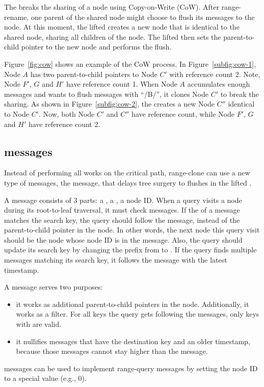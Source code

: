 The \bedag breaks the sharing of a node using Copy-on-Write (CoW).
After range-rename, one parent of the shared node might choose to flush its
messages to the node.
At this moment, the lifted \bedag creates a new node that is identical to the
shared node, sharing all children of the node.
The lifted \bedag then sets the parent-to-child pointer to the new node and
performs the flush.

Figure~\ref{fig:cow} shows an example of the CoW process.
In Figure~\ref{subfig:cow-1}, Node $A$ has two parent-to-child pointers to
Node $C'$ with reference count 2.
Note, Node $F'$, $G$ and $H'$ have reference count 1.
When Node $A$ accumulates enough messages and wants to flush messages with
``/B/'', it clones Node $C'$ to break the sharing.
As shown in Figure~\ref{subfig:cow-2}, the \bedag creates a new Node $C''$
identical to Node $C'$.
Now, both Node $C'$ and $C''$ have reference count, while Node $F'$, $G$ and
$H'$ have reference count 2.

\subsection{\goto messages}

Instead of performing all works on the critical path, range-clone can use a
new type of messages, the \goto message, that delays tree surgery to flushes
in the lifted \bedag.

A \goto message consists of 3 parts: a \dpre, a \spre, a node ID.
When a query visits a node during its root-to-leaf traversal, it must check
\goto messages.
If the \dpre of a \goto message matches the search key, the query should follow
the \goto message, instead of the parent-to-child pointer in the node.
In other words, the next node this query visit should be the node whose node ID
is in the \goto message.
Also, the query should update its search key by changing the prefix from \dpre
to \spre.
If the query finds multiple \goto messages matching its search key, it follows
the \goto message with the latest timestamp.

A \goto message serves two purposes:
\begin{itemize}
\item it works as additional parent-to-child pointers in the node.
Additionally, it works as a filter.
For all keys the query gets following the \goto messages, only keys with \spre
are valid.
\item it nullifies messages that have the destination key and an older
timestamp, because those messages cannot stay higher than the \goto message.
\end{itemize}
\goto messages can be used to implement range-query messages by setting the node
ID to a special value (e.g., 0).

